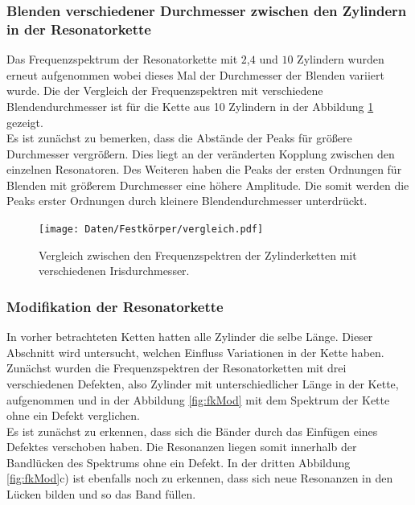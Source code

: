 \subsubsection{Blenden verschiedener Durchmesser zwischen den Zylindern in der Resonatorkette}

Das Frequenzspektrum der Resonatorkette mit $2$,$4$ und $10$ Zylindern wurden erneut aufgenommen wobei dieses Mal der Durchmesser der Blenden variiert wurde. 
Die der Vergleich der Frequenzspektren mit verschiedene Blendendurchmesser ist für die Kette aus 10 Zylindern in der Abbildung \ref{fig:fkvergleich} gezeigt. \\
Es ist zunächst zu bemerken, dass die Abstände der Peaks für größere Durchmesser vergrößern. Dies liegt an der veränderten Kopplung zwischen den einzelnen Resonatoren. 
Des Weiteren haben die Peaks der ersten Ordnungen für Blenden mit größerem Durchmesser eine höhere Amplitude. Die somit werden die Peaks erster Ordnungen durch kleinere Blendendurchmesser unterdrückt. 

\begin{figure}[H]
  \centering
  \texttt{[image: Daten/Festkörper/vergleich.pdf]}
  \caption{Vergleich zwischen den Frequenzspektren der Zylinderketten mit verschiedenen Irisdurchmesser.}
  \label{fig:fkvergleich}
\end{figure}
\subsubsection{Modifikation der Resonatorkette}

In vorher betrachteten Ketten hatten alle Zylinder die selbe Länge. 
Dieser Abschnitt wird untersucht, welchen Einfluss Variationen in der Kette haben. \\
Zunächst wurden die Frequenzspektren der Resonatorketten mit drei verschiedenen Defekten, also Zylinder mit unterschiedlicher Länge in der Kette, aufgenommen und in der Abbildung \ref{fig:fkMod} mit dem Spektrum der Kette ohne ein Defekt verglichen. \\
Es ist zunächst zu erkennen, dass sich die Bänder durch das Einfügen eines Defektes verschoben haben. Die Resonanzen liegen somit innerhalb der Bandlücken des Spektrums ohne ein Defekt. In der dritten Abbildung \ref{fig:fkMod}c) ist ebenfalls noch zu erkennen, dass sich neue Resonanzen in den Lücken bilden und so das Band füllen. 


